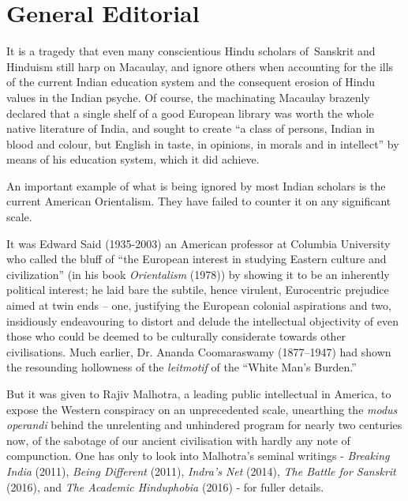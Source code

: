\chapter*{General Editorial}\label{gen_editorial}

It is a tragedy that even many conscientious Hindu scholars of~Sanskrit and Hinduism still harp on Macaulay, and ignore others when accounting for the ills of the current Indian education system and the consequent erosion of Hindu values in the Indian psyche. Of course, the machinating Macaulay brazenly declared that a single shelf of a good European library was worth the whole native literature of India, and sought to create “a class of persons, Indian in blood and colour, but English in taste, in opinions, in morals and in intellect” by means of his education system, which it did achieve. 

An important example of what is being ignored by most Indian scholars is the current American Orientalism. They have failed to counter it on any significant scale. 

It was Edward Said (1935-2003) an American professor at Columbia University who called the bluff of “the European interest in studying Eastern culture and civilization” (in his book {\sl Orientalism} (1978)) by showing it to be an inherently political interest; he laid bare the subtile, hence virulent, Eurocentric prejudice aimed at twin ends – one, justifying the European colonial aspirations and two, insidiously endeavouring to distort  and delude the intellectual objectivity of even those who could be deemed to be culturally considerate towards other civilisations. Much earlier, Dr. Ananda Coomaraswamy (1877--1947) had shown the resounding hollowness of the {\sl leitmotif} of the “White Man’s Burden.” 

But it was given to Rajiv Malhotra, a leading public intellectual in America, to expose the Western conspiracy on an unprecedented scale, unearthing the {\sl modus operandi} behind the unrelenting and unhindered program for nearly two centuries now, of the sabotage of our ancient civilisation with hardly any note of compunction.  One has only to look into Malhotra’s seminal writings - {\sl Breaking India} (2011), {\sl Being Different} (2011), {\sl Indra’s Net} (2014), {\sl The Battle for Sanskrit} (2016), and {\sl The Academic Hinduphobia} (2016) - for fuller details.
\vskip 1.5pt

